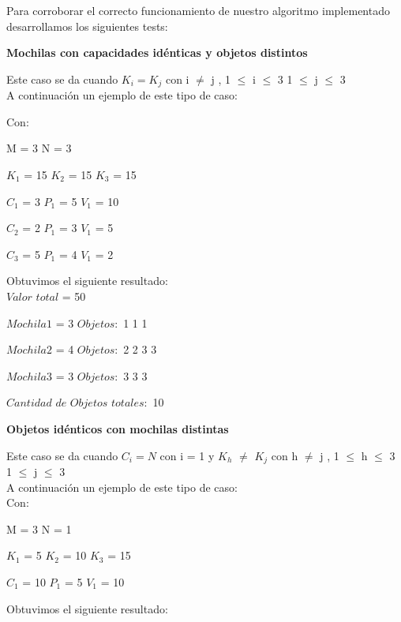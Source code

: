 \indent Para corroborar el correcto funcionamiento de nuestro algoritmo implementado desarrollamos los siguientes tests:\\


\begin{center}
 \textbf{Mochilas con capacidades id\'enticas y objetos distintos}
\end{center}

Este caso se da cuando $K_{i} = K_{j}$ con i $\neq$ j , 1 $\leq$ i $\leq$ 3  1 $\leq$ j $\leq$ 3  \\

A continuaci\'on un ejemplo de este tipo de caso:

Con:

M = 3 N = 3

$K_{1}$ = 15  $K_{2}$ = 15  $K_{3}$ = 15 

$C_{1}$ = 3 $P_{1}$ = 5 $V_{1}$ = 10

$C_{2}$ = 2 $P_{1}$ = 3 $V_{1}$ = 5

$C_{3}$ = 5 $P_{1}$ = 4 $V_{1}$ = 2
  
  \indent  
  
  Obtuvimos el siguiente resultado:\\

$Valor$ $total$ = 50

$Mochila1$ = 3 $Objetos:$ 1 1 1

$Mochila2$ = 4 $Objetos:$ 2 2 3 3

$Mochila3$ = 3 $Objetos:$ 3 3 3

$Cantidad$ $de$ $Objetos$ $totales:$ 10



\begin{center}
 \textbf{Objetos id\'enticos con mochilas distintas}
\end{center}

Este caso se da cuando $C_{i} = N$ con i = 1 y $K_{h}$ $\neq$ $K_{j}$ con h $\neq$ j , 1 $\leq$ h $\leq$ 3  1 $\leq$ j $\leq$ 3 \\

A continuaci\'on un ejemplo de este tipo de caso:\\

 Con:
 
 M = 3 N = 1
 
 $K_{1}$ = 5  $K_{2}$ = 10  $K_{3}$ = 15
 
 $C_{1}$ = 10 $P_{1}$ = 5 $V_{1}$ = 10
  
  \indent  
  
  Obtuvimos el siguiente resultado:\\

